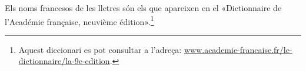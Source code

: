 Els noms francesos de les lletres són els que apareixen en el «Dictionnaire de l'Académie française, neuvième édition».\footnote{Aquest diccionari es pot consultar a l'adreça: \href{http://www.academie-francaise.fr/le-dictionnaire/la-9e-edition}{www.academie-francaise.fr/le-dictionnaire/la-9e-edition}.} 